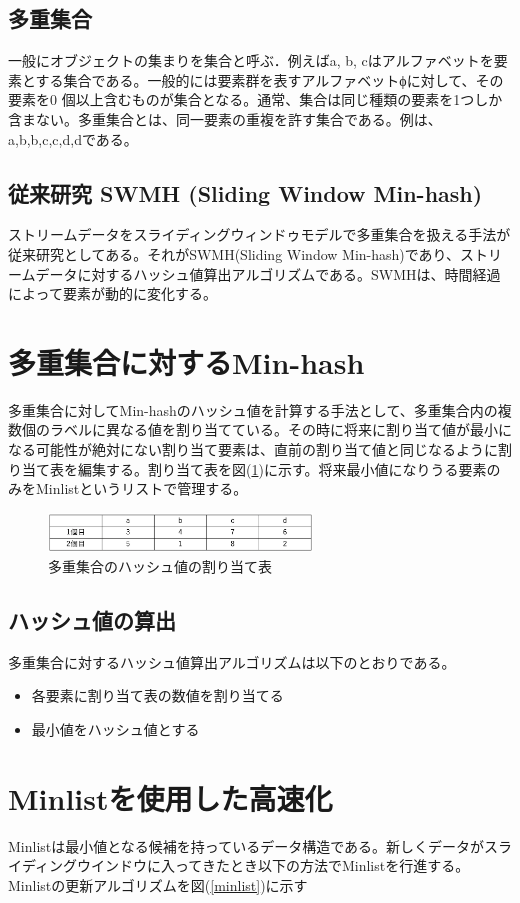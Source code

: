\documentclass{interim} %
\begin{document}
\subsection{多重集合}
一般にオブジェクトの集まりを集合と呼ぶ．例えば{a, b, c}はアルファベットを要素とする集合である。一般的には要素群を表すアルファベットϕに対して、その要素を0 個以上含むものが集合となる。通常、集合は同じ種類の要素を1つしか含まない。多重集合とは、同一要素の重複を許す集合である。例は、{a,b,b,c,c,d,d}である。

\subsection{従来研究 SWMH (Sliding Window Min-hash)}
ストリームデータをスライディングウィンドゥモデルで多重集合を扱える手法が従来研究としてある。それがSWMH(Sliding Window Min-hash)であり、ストリームデータに対するハッシュ値算出アルゴリズムである。SWMHは、時間経過によって要素が動的に変化する。

\section{多重集合に対するMin-hash}
多重集合に対してMin-hashのハッシュ値を計算する手法として、多重集合内の複数個のラベルに異なる値を割り当てている。その時に将来に割り当て値が最小になる可能性が絶対にない割り当て要素は、直前の割り当て値と同じなるように割り当て表を編集する。割り当て表を図(\ref{wariate})に示す。将来最小値になりうる要素のみをMinlistというリストで管理する。

\begin{figure}[t]
	\centering
	\includegraphics[width=7cm]{wariate.png}
	\caption{多重集合のハッシュ値の割り当て表}
	\label{wariate}
\end{figure}

\subsection{ハッシュ値の算出}
多重集合に対するハッシュ値算出アルゴリズムは以下のとおりである。
\begin{itemize}
	\item[1] 各要素に割り当て表の数値を割り当てる
	\item[2] 最小値をハッシュ値とする
\end{itemize}

\section{Minlistを使用した高速化}
Minlistは最小値となる候補を持っているデータ構造である。新しくデータがスライディングウインドウに入ってきたとき以下の方法でMinlistを行進する。Minlistの更新アルゴリズムを図(\ref{minlist})に示す
\end{document}
